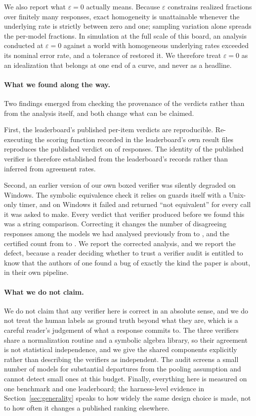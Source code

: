 We also report what $\varepsilon = 0$ actually means. Because $\varepsilon$ constrains
realized fractions over finitely many responses, exact homogeneity is unattainable whenever
the underlying rate is strictly between zero and one; sampling variation alone spreads the
per-model fractions. In simulation at the full scale of this board, an analysis conducted at
$\varepsilon = 0$ against a world with homogeneous underlying rates exceeded its nominal error
rate, and a tolerance of \EpsPrereg{} restored it. We therefore treat $\varepsilon = 0$ as an
idealization that belongs at one end of a curve, and never as a headline.

\paragraph{What we found along the way.}
Two findings emerged from checking the provenance of the verdicts rather than from the
analysis itself, and both change what can be claimed.

First, the leaderboard's published per-item verdicts are reproducible. Re-executing the
scoring function recorded in the leaderboard's own result files reproduces the published
verdict on \EmReexecItems{} of \EmReexecItems{} responses. The identity of the published
verifier is therefore established from the leaderboard's records rather than inferred from
agreement rates.

Second, an earlier version of our own boxed verifier was silently degraded on Windows. The
symbolic equivalence check it relies on guards itself with a Unix-only timer, and on Windows
it failed and returned ``not equivalent'' for every call it was asked to make. Every verdict
that verifier produced before we found this was a string comparison. Correcting it changes
the number of disagreeing responses among the models we had analysed previously from
\DisagreeSbEmSeventeenString{} to \DisagreeSbEmSeventeen{}, and the certified count from
\AnchorStringCombined{} to \AnchorSympyCombined{}. We report the corrected analysis, and we
report the defect, because a reader deciding whether to trust a verifier audit is entitled to
know that the authors of one found a bug of exactly the kind the paper is about, in their own
pipeline.

\paragraph{What we do not claim.}
We do not claim that any verifier here is correct in an absolute sense, and we do not treat
the human labels as ground truth beyond what they are, which is a careful reader's judgement
of what a response commits to. The three verifiers share a normalization routine and a
symbolic algebra library, so their agreement is not statistical independence, and we give the
shared components explicitly rather than describing the verifiers as independent. The audit
screens a small number of models for substantial departures from the pooling assumption and
cannot detect small ones at this budget. Finally, everything here is measured on one
benchmark and one leaderboard; the harness-level evidence in
Section~\ref{sec:generality} speaks to how widely the same design choice is made, not to how
often it changes a published ranking elsewhere.
